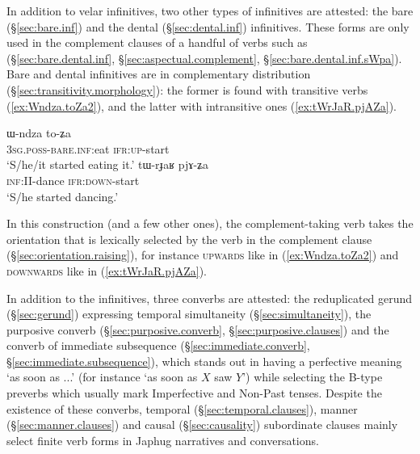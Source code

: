 In addition to velar infinitives, two other types of infinitives are attested: the bare (§\ref{sec:bare.inf}) and the  dental (§\ref{sec:dental.inf}) infinitives. These forms are only used in the complement clauses of a handful of verbs such as  (§\ref{sec:bare.dental.inf}, §\ref{sec:aspectual.complement}, §\ref{sec:bare.dental.inf.sWpa}). Bare and dental infinitives are in complementary distribution (§\ref{sec:transitivity.morphology}): the former is found with transitive verbs (\ref{ex:Wndza.toZa2}), and the latter with intransitive ones (\ref{ex:tWrJaR.pjAZa}).

\begin{exe}
\ex 
\begin{xlist}
\ex \label{ex:Wndza.toZa2}
\gll  ɯ-ndza to-ʑa \\
\textsc{3sg}.\textsc{poss}-\textsc{bare}.\textsc{inf}:eat \textsc{ifr}:\textsc{up}-start \\
\glt `S/he/it started eating it.' 
\ex \label{ex:tWrJaR.pjAZa}
\gll tɯ-rɟaʁ pjɤ-ʑa \\
\textsc{inf}:II-dance \textsc{ifr}:\textsc{down}-start \\
\glt `S/he started dancing.' 
\end{xlist}
\end{exe}

In this construction (and a few other ones), the complement-taking verb takes the orientation that is lexically selected by the verb in the complement clause (§\ref{sec:orientation.raising}), for instance \textsc{upwards} like  in (\ref{ex:Wndza.toZa2}) and \textsc{downwards} like  in (\ref{ex:tWrJaR.pjAZa}).

In addition to the infinitives, three converbs are attested: the reduplicated gerund  (§\ref{sec:gerund}) expressing temporal simultaneity (§\ref{sec:simultaneity}), the purposive converb (§\ref{sec:purposive.converb}, §\ref{sec:purposive.clauses}) and the converb of immediate subsequence (§\ref{sec:immediate.converb}, §\ref{sec:immediate.subsequence}), which stands out in having a perfective meaning `as soon as ...' (for instance   `as soon as $X$ saw $Y$') while selecting the B-type preverbs which usually mark Imperfective and Non-Past tenses. Despite the existence of these converbs, temporal (§\ref{sec:temporal.clauses}), manner (§\ref{sec:manner.clauses}) and causal (§\ref{sec:causality}) subordinate clauses mainly select finite verb forms in Japhug narratives and conversations.

